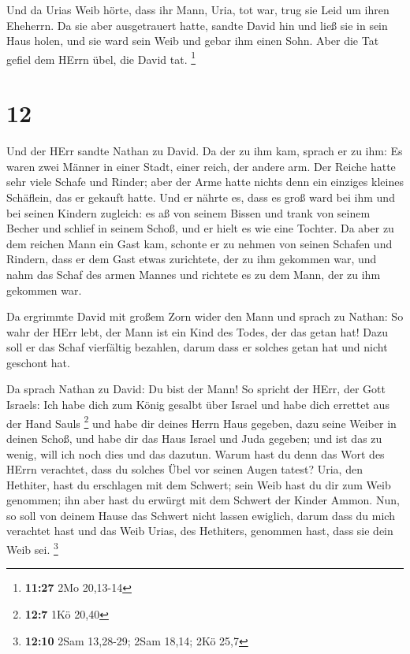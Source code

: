  Und da Urias Weib hörte, dass ihr Mann, Uria, tot war,
trug sie Leid um ihren Eheherrn.  Da sie aber ausgetrauert
hatte, sandte David hin und ließ sie in sein Haus holen, und sie ward
sein Weib und gebar ihm einen Sohn. Aber die Tat gefiel dem HErrn übel,
die David tat. \footnote{\textbf{11:27} 2Mo 20,13-14}

\hypertarget{section-1}{%
\section{12}\label{section-1}}

 Und der HErr sandte Nathan zu David. Da der zu ihm kam,
sprach er zu ihm: Es waren zwei Männer in einer Stadt, einer reich, der
andere arm.  Der Reiche hatte sehr viele Schafe und Rinder;
 aber der Arme hatte nichts denn ein einziges kleines
Schäflein, das er gekauft hatte. Und er nährte es, dass es groß ward bei
ihm und bei seinen Kindern zugleich: es aß von seinem Bissen und trank
von seinem Becher und schlief in seinem Schoß, und er hielt es wie eine
Tochter.  Da aber zu dem reichen Mann ein Gast kam, schonte
er zu nehmen von seinen Schafen und Rindern, dass er dem Gast etwas
zurichtete, der zu ihm gekommen war, und nahm das Schaf des armen Mannes
und richtete es zu dem Mann, der zu ihm gekommen war.

 Da ergrimmte David mit großem Zorn wider den Mann und
sprach zu Nathan: So wahr der HErr lebt, der Mann ist ein Kind des
Todes, der das getan hat!  Dazu soll er das Schaf vierfältig
bezahlen, darum dass er solches getan hat und nicht geschont hat.

 Da sprach Nathan zu David: Du bist der Mann! So spricht der
HErr, der Gott Israels: Ich habe dich zum König gesalbt über Israel und
habe dich errettet aus der Hand Sauls \footnote{\textbf{12:7} 1Kö 20,40}
 und habe dir deines Herrn Haus gegeben, dazu seine Weiber
in deinen Schoß, und habe dir das Haus Israel und Juda gegeben; und ist
das zu wenig, will ich noch dies und das dazutun.  Warum
hast du denn das Wort des HErrn verachtet, dass du solches Übel vor
seinen Augen tatest? Uria, den Hethiter, hast du erschlagen mit dem
Schwert; sein Weib hast du dir zum Weib genommen; ihn aber hast du
erwürgt mit dem Schwert der Kinder Ammon.  Nun, so soll von
deinem Hause das Schwert nicht lassen ewiglich, darum dass du mich
verachtet hast und das Weib Urias, des Hethiters, genommen hast, dass
sie dein Weib sei. \footnote{\textbf{12:10} 2Sam 13,28-29; 2Sam 18,14;
  2Kö 25,7}

